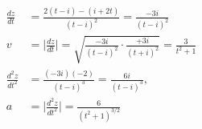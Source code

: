 \documentclass[preview]{standalone}
\begin{document}
\begin{align*}
\frac{dz}{dt} &= \frac{2(t-i) - (i+2t)}{(t-i)^2} = \frac{-3i}{(t-i)^2} \\ v &= \Big|\frac{dz}{dt}\Big| = \sqrt{\frac{-3i}{(t-i)^2} \cdot \frac{+3i}{(t+i)^2}} =  \frac{3}{t^2 + 1 } \\ \frac{d^2 z}{dt^2} &= \frac{(-3i)(-2)}{(t-i)^3} = \frac{6i}{(t-i)^3}, \\ a &= \Big|\frac{d^2z}{dt^2}\Big| =  \frac{6}{(t^2+1)^{3/2 }}
\end{align*}
\end{document}
